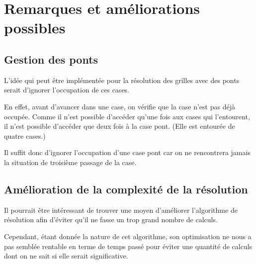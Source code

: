 \chapter{Remarques et améliorations possibles}

\section*{Gestion des ponts}

L'idée qui peut être implémentée pour la résolution des grilles avec des ponts serait d'ignorer l'occupation de ces cases.

En effet, avant d'avancer dans une case, on vérifie que la case n'est pas déjà occupée. Comme il n'est possible d'accéder qu'une fois aux cases qui l'entourent, il n'est possible d'accéder que deux fois à la case pont. (Elle est entourée de quatre cases.)

Il suffit donc d'ignorer l'occupation d'une case pont car on ne rencontrera jamais la situation de troisième passage de la case.

\section*{Amélioration de la complexité de la résolution}
Il pourrait être intéressant de trouver une moyen d'améliorer l'algorithme de résolution afin d'éviter qu'il ne fasse un trop grand nombre de calculs.

Cependant, étant donnée la nature de cet algorithme, son optimisation ne nous a pas semblée rentable en terme de temps passé pour éviter une quantité de calculs dont on ne sait si elle serait significative.